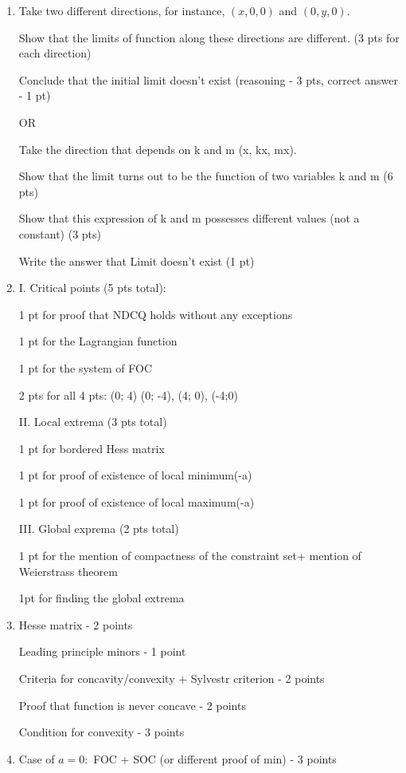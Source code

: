 \begin{enumerate}
  \item Take two different directions, for instance, $(x,0,0)$ and $(0,y,0)$.
  
  Show that the limits of function along these directions are different. (3 pts for each direction)
  
  Conclude that the initial limit doesn't exist (reasoning - 3 pts, correct answer - 1 pt)
  
  OR
  
  Take the direction that depends on k and m (x, kx, mx). 
  
  Show that the limit turns out to be the function of two variables k and m (6 pts)
  
  Show that this expression of k and m possesses different values (not a constant) (3 pts)
  
  Write the answer that Limit doesn't exist (1 pt)
  
  \item
  I. Critical points (5 pts total):
  
  1 pt for proof that NDCQ holds without any exceptions
  
  1 pt for the Lagrangian function
  
  1 pt for the system of FOC
  
  2 pts for all 4 pts: (0; 4) (0; -4), (4; 0), (-4;0)
  
  II. Local extrema (3 pts total)
  
  1 pt for bordered Hess matrix
  
  1 pt for proof of existence of local minimum(-a)
  
  1 pt for proof of existence of local maximum(-a)
  
  III. Global exprema (2 pts total)
  
  1 pt for the mention of compactness of the constraint set+ mention of Weierstrass theorem
  
  1pt for finding the global extrema

  \item Hesse matrix - 2 points
  
  Leading principle minors - 1 point
  
  Criteria for concavity/convexity + Sylvestr criterion - 2 points
  
  Proof that function is never concave - 2 points
  
  Condition for convexity - 3 points
  
  
  \item 
  Case of $a=0:$ FOC + SOC (or different proof of min) - 3 points
  

\end{enumerate}
